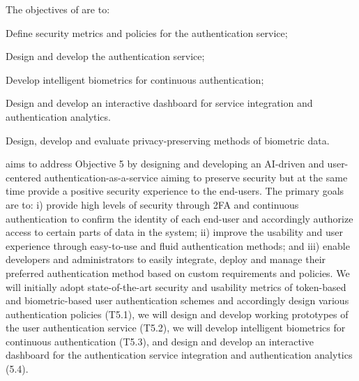 \addtocounter{wpno}{1}
\begin{Workpackage}{\thewpno}
\WPTitle{\wpname{\thewpno}}

\begin{WPObjectives}
The objectives of \theWP{} are to:
\begin{compactitem}
\item Define security metrics and policies for the authentication service;
\item Design and develop the authentication service;
\item Develop intelligent biometrics for continuous authentication;
\item Design and develop an interactive dashboard for service integration and authentication analytics.
\item Design, develop and evaluate privacy-preserving methods of biometric data.
\end{compactitem}
\end{WPObjectives}

\begin{WPDescription}
\theWP{} aims to address Objective 5 by designing and developing an AI-driven and user-centered authentication-as-a-service aiming to preserve security but at the same time provide a positive security experience to the end-users. The primary goals are to: i) provide high levels of security through 2FA and continuous authentication to confirm the identity of each end-user and accordingly authorize access to certain parts of data in the system; ii) improve the usability and user experience through easy-to-use and fluid authentication methods; and iii) enable developers and administrators to easily integrate, deploy and manage their preferred authentication method based on custom requirements and policies. We will initially adopt state-of-the-art security and usability metrics of token-based and biometric-based user authentication schemes and accordingly design various authentication policies (T5.1), we will design and develop working prototypes of the user authentication service (T5.2), we will develop intelligent biometrics for continuous authentication (T5.3), and design and develop an interactive dashboard for the authentication service integration and authentication analytics (5.4).

\end{WPDescription}

\begin{Task}


\end{Task}
\end{Workpackage}
